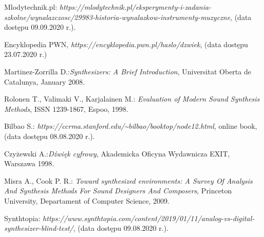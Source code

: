 \documentclass[nostrict]{szablonPG}
\begin{document}



	\setcounter{page}{3}
	\let\cleardoublepage\clearpage
	
	
	\tableofcontents    %
	
%	
	
	
	
	
	
	
	
%	
	
	
%	
%	
	

	\listoffigures      %
	\listoftables

	\begin{thebibliography}{20}                      %
		\small              %
		Mlodytechnik.pl: \emph{https://mlodytechnik.pl/eksperymenty-i-zadania-szkolne/wynalazczosc/29983-historia-wynalazkow-instrumenty-muzyczne}, (data dostępu 09.09.2020 r.).
		
		Encyklopedia PWN, \emph{https://encyklopedia.pwn.pl/haslo/dzwiek}, (data dostępu 23.07.2020 r.)
		
		Martinez-Zorrilla D.:\emph{Synthesizers: A Brief Introduction}, Universitat Oberta de Catalunya, January 2008.

		Rolonen T., Valimaki V., Karjalainen M.: \emph{Evaluation of Modern Sound Synthesis Methods}, ISSN 1239-1867, Espoo, 1998.

		Bilbao S.: \emph{https://ccrma.stanford.edu/\textasciitilde bilbao/booktop/node12.html}, online book, (data dostępu 08.08.2020 r.).
		
		Czyżewski A.:\emph{Dźwięk cyfrowy}, Akademicka Oficyna Wydawnicza EXIT, Warszawa 1998.
		 
		Misra A., Cook P. R.: \emph{Toward synthesized environments: A Survey Of Analysis And Synthesis Methods For Sound Designers And Composers}, Princeton University, Departament of Computer Science, 2009.
		
		Synthtopia: \emph{https://www.synthtopia.com/content/2019/01/11/analog-vs-digital-synthesizer-blind-test/}, (data dostępu 09.08.2020 r.).


\end{thebibliography}
\end{document}
